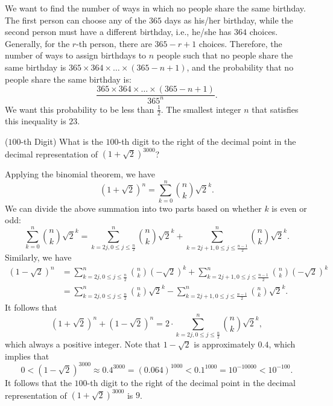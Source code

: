 \documentclass[12pt,letterpaper, onecolumn]{exam}
\begin{document}
\begin{questions}
\begin{solution}
        \quad We want to find the number of ways in which no people share the same birthday. The first person can choose any of the $365$ days as his/her birthday, while the second person must have a different birthday, i.e., he/she has $364$ choices. Generally, for the $r$-th person, there are $365-r+1$ choices. Therefore, the number of ways to assign birthdays to $n$ people such that no people share the same birthday is $365 \times 364 \times \dots \times (365-n+1)$, and the probability that no people share the same birthday is:
        $$\frac{365 \times 364 \times \dots \times (365-n+1)}{365^n}.$$
        We want this probability to be less than $\frac{1}{2}$. The smallest integer $n$ that satisfies this inequality is $23$.
    \end{solution}

    \pagebreak %
    
    \question[]($100$-th Digit) What is the $100$-th digit to the right of the decimal point in the decimal representation of $(1+\sqrt{2})^{3000}$?
    \begin{solution}
            Applying the binomial theorem, we have 
            $$(1+\sqrt{2})^n=\sum\limits_{k=0}^n\binom{n}{k}\sqrt{2}^k.$$
            We can divide the above summation into two parts based on whether $k$ is even or odd:
            $$\sum\limits_{k=0}^n\binom{n}{k}\sqrt{2}^k=\sum\limits_{k=2j,0\le j\le\frac{n}{2}}^n\binom{n}{k}\sqrt{2}^k+\sum\limits_{k=2j+1,0\le j\le\frac{n-1}{2}}^n\binom{n}{k}\sqrt{2}^k.$$
            Similarly, we have
            \begin{align*}
                (1-\sqrt{2})^n&=\sum\limits_{k=2j,0\le j\le\frac{n}{2}}^n\binom{n}{k}(-\sqrt{2})^k+\sum\limits_{k=2j+1,0\le j\le\frac{n-1}{2}}^n\binom{n}{k}(-\sqrt{2})^k\\
                &=\sum\limits_{k=2j,0\le j\le\frac{n}{2}}^n\binom{n}{k}\sqrt{2}^k-\sum\limits_{k=2j+1,0\le j\le\frac{n-1}{2}}^n\binom{n}{k}\sqrt{2}^k.
            \end{align*}
            It follows that
            $$(1+\sqrt{2})^n+(1-\sqrt{2})^n=2\cdot\sum\limits_{k=2j,0\le j\le\frac{n}{2}}^n\binom{n}{k}\sqrt{2}^k,$$
            which always a positive integer. Note that $1-\sqrt{2}$ is approximately $0.4$, which implies that
            $$0<(1-\sqrt{2})^{3000}\approx 0.4^{3000}=(0.064)^{1000}<0.1^{1000}=10^{-10000}<10^{-100}.$$
            It follows that the $100$-th digit to the right of the decimal point in the decimal representation of $(1+\sqrt{2})^{3000}$ is $9$.
    \end{solution}


\end{questions}
\end{document}

